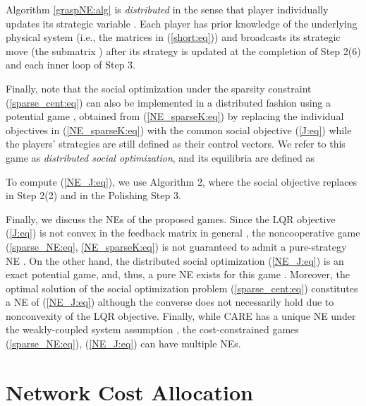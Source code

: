 \documentclass[12pt, draftclsnofoot,onecolumn]{IEEEtran}
\begin{document}
Algorithm \ref{graspNE:alg} is {\it distributed} in the sense that player  individually updates its strategic variable . Each player has prior knowledge of the underlying physical system (i.e., the matrices  in (\ref{short:eq})) and broadcasts its strategic move (the submatrix ) after its strategy is updated at the completion of Step 2(6) and each inner loop of Step 3. 

Finally, note that the social optimization under the sparsity constraint (\ref{sparse_cent:eq}) can also be implemented in a distributed fashion using a potential game \cite{li2013designing}, obtained from (\ref{NE_sparseK:eq}) by replacing the individual objectives in (\ref{NE_sparseK:eq}) with the common social objective (\ref{J:eq}) while the players' strategies are still defined as their control vectors. We refer to this game as {\it distributed social optimization}, and its equilibria are defined as

\noindent To compute (\ref{NE_J:eq}), we use Algorithm 2, where the social objective  replaces  in Step 2(2) and in the Polishing Step 3. 


Finally, we discuss the NEs of the proposed games. Since the LQR objective (\ref{J:eq}) is not convex in the feedback matrix  in general \cite{rautert1997computational}, the noncooperative game (\ref{sparse_NE:eq}, \ref{NE_sparseK:eq}) is not guaranteed to admit a pure-strategy NE \cite{pang2011nonconvex}. On the other hand, the distributed social optimization (\ref{NE_J:eq}) is an exact potential game, and, thus, a pure NE exists for this game \cite{li2013designing}. Moreover, the optimal solution of the social optimization problem (\ref{sparse_cent:eq}) constitutes a NE of (\ref{NE_J:eq}) although the converse does not necessarily hold due to nonconvexity of the LQR objective. Finally, while CARE has a unique NE under the weakly-coupled system assumption \cite{Mukaidani2006}, the cost-constrained games (\ref{sparse_NE:eq}), (\ref{NE_J:eq}) can have multiple NEs.

 \section{Network Cost Allocation}
\label{network:sec}
\end{document}
